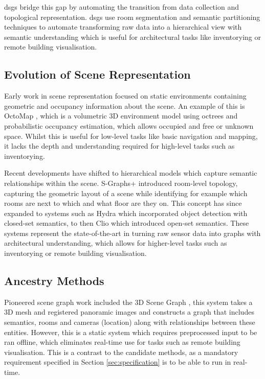 \gls{dsg}s bridge this gap by automating the transition from data collection and topological representation. \gls{dsg}s use room segmentation and semantic partitioning techniques to automate transforming raw data into a hierarchical view with semantic understanding which is useful for architectural tasks like inventorying or remote building visualisation.


\subsection{Evolution of Scene Representation}\label{sec:related:scene-evolution}

Early work in scene representation focused on static environments containing geometric and occupancy information about the scene. An example of this is OctoMap \cite{hornung2013octomap}, which is a volumetric 3D environment model using octrees and probabilistic occupancy estimation, which allows occupied and free or unknown space. Whilst this is useful for low-level tasks like basic navigation and mapping, it lacks the depth and understanding required for high-level tasks such as inventorying.

Recent developments have shifted to hierarchical models which capture semantic relationships within the scene. S-Graphs+ \cite{s_graphs_plus} introduced room-level topology, capturing the geometric layout of a scene while identifying for example which rooms are next to which and what floor are they on. This concept has since expanded to systems such as Hydra \cite{hydra} which incorporated object detection with closed-set semantics, to then Clio \cite{clio} which introduced open-set semantics. These systems represent the state-of-the-art in turning raw sensor data into graphs with architectural understanding, which allows for higher-level tasks such as inventorying or remote building visualisation.

\subsection{Ancestry Methods}\label{sec:related:ancestry}

Pioneered scene graph work included the 3D Scene Graph \cite{DBLP:journals/corr/abs-1910-02527}, this system takes a 3D mesh and registered panoramic images and constructs a graph that includes semantics, rooms and cameras (location) along with relationships between these entities. However, this is a static system which requires preprocessed input to be ran offline, which eliminates real-time use for tasks such as remote building visualisation. This is a contrast to the candidate methods, as a mandatory requirement specified in Section \ref{sec:specification} is to be able to run in real-time.

